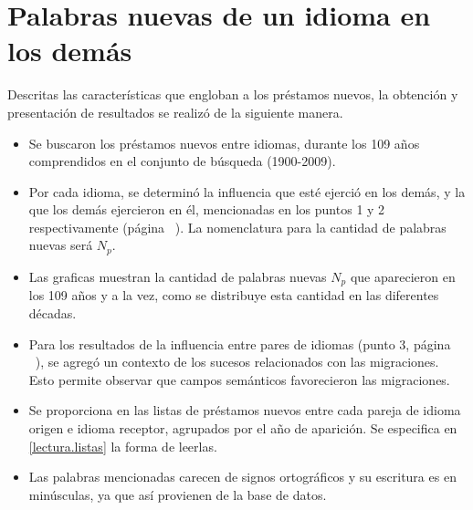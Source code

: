 \section{Palabras nuevas de un idioma en los demás} %

Descritas las características que engloban a los préstamos nuevos, la obtención y presentación de resultados se realizó de la siguiente manera. 



\begin{itemize}

\item Se buscaron los préstamos nuevos entre idiomas,  durante los 109 años comprendidos en el conjunto de búsqueda (1900-2009).
	
\item Por cada idioma, se determinó la influencia que esté ejerció en los demás, y la que los demás ejercieron en él, mencionadas en los puntos 1 y 2 respectivamente (página ~\pageref{proceso.nuevos}).   La nomenclatura para la cantidad de palabras nuevas será $N_{p}$.

\item Las graficas muestran la cantidad de palabras nuevas $N_{p}$ que aparecieron en los 109 años y a la vez, como se distribuye esta cantidad en las diferentes décadas. 

\item Para los resultados de la influencia entre pares de idiomas (punto 3, página ~\pageref{proceso.nuevos}), se agregó un contexto de los sucesos relacionados con las migraciones. Esto permite observar que campos semánticos favorecieron las migraciones. 

\item Se proporciona en \cite{prestamos_nuevos} las listas  de préstamos nuevos entre cada pareja de idioma origen e idioma receptor, agrupados por el año de aparición.  Se especifica en \ref{lectura.listas}  la forma de leerlas.

\item Las palabras mencionadas carecen de signos ortográficos y su escritura es en minúsculas, ya que así provienen de la base de datos. 


\end{itemize}

